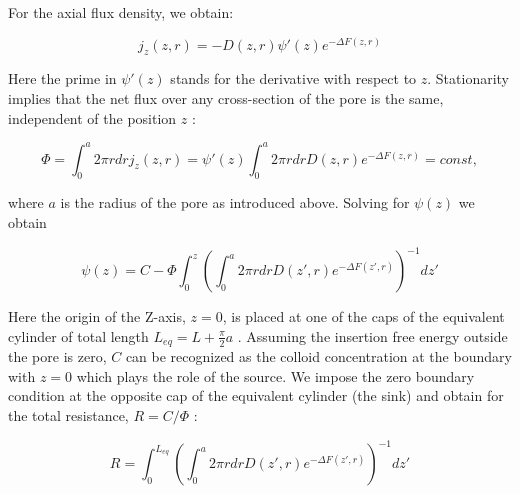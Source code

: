\documentclass[12pt, a4paper]{article}
\begin{document}
For the axial flux density, we obtain:

\begin{equation}
j_{z}(z,r)=-D(z,r)\psi'(z)e^{-\Delta F(z,r)}\label{eq:flux_ansatz}
\end{equation}

\noindent Here the prime in  $\psi'(z)$ stands for the derivative with respect to $z$. Stationarity implies that the net flux over any cross-section of the pore is the same, independent of the position  $z$ :

\begin{equation}
\Phi=\int_{0}^{a}2\pi rdrj_{z}(z,r)=\psi'(z)\int_{0}^{a}2\pi rdrD(z,r)e^{-\Delta F(z,r)}=const,\label{eq:fi_const}
\end{equation}

\noindent where $a$ is the radius of the pore as introduced above. Solving for $\psi(z)$  we obtain 

\begin{equation}
\psi(z)=C-\Phi\int_{0}^{z}\left(\int_{0}^{a}2\pi rdrD(z',r)e^{-\Delta F(z',r)}\right)^{-1}dz'\label{eq:psi}
\end{equation}

\noindent Here the origin of the Z-axis,  $z=0$, is placed at one of the caps of the equivalent cylinder  of total length $L_{eq}= L+\frac{\pi}{2}a$  . Assuming the insertion free energy outside the pore is zero, $ C$  can be recognized as the colloid concentration at the boundary with $z=0$ which plays the role of the source.   We impose the zero boundary condition at the opposite cap of the equivalent cylinder (the sink) and obtain for the total resistance, $R=C/\Phi$ : 

\begin{equation}
R=\int_{0}^{L_{eq}}\left(\int_{0}^{a}2\pi rdrD(z',r)e^{-\Delta F(z',r)}\right)^{-1}dz'\label{eq:res_with_brush}
\end{equation}
\end{document}

